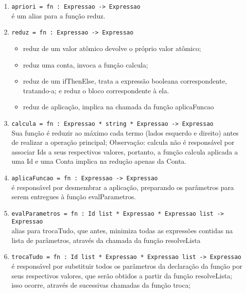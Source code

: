 \documentclass[brazil,times]{abnt}
\begin{document}
\begin{enumerate}
    \item \texttt{apriori = fn : Expressao -> Expressao} \\ é um alias para a função reduz.

    \item \texttt{reduz = fn : Expressao -> Expressao}
        \begin{itemize}
            \item reduz de um valor atômico devolve o próprio valor atômico;
            \item reduz uma conta, invoca a função calcula;
            \item reduz de um ifThenElse, trata a expressão booleana correspondente, tratando-a; e reduz o bloco correspondente à ela.
            \item reduz de aplicação, implica na chamada da função aplicaFuncao
            
        \end{itemize}

     \item \texttt{calcula = fn : Expressao * string * Expressao -> Expressao} \\
      Sua função é reduzir ao máximo cada termo (lados esquerdo e direito) antes de realizar a operação principal;
        Observação: calcula não é responsável por associar Ids a seus respectivos valores, portanto, a função calcula aplicada a uma Id e uma Conta implica na redução apenas da Conta.
        
     \item \texttt{aplicaFuncao = fn : Expressao -> Expressao} \\ é responsável por desmembrar a aplicação, preparando os parâmetros para serem entregues à função evalParametros.
     
     \item \texttt{evalParametros = fn : Id list * Expressao * Expressao list -> Expressao} \\ alias para trocaTudo, que antes, minimiza todas as expressões contidas na lista de parâmetros, através da chamada da função resolveLista
     
     \item \texttt{trocaTudo = fn : Id list * Expressao * Expressao list -> Expressao} \\ é responsável por substituir todos os parâmetros da declaração da função por seus respectivos valores, que serão obtidos a partir da função resolveLista; isso ocorre, através de sucessivas chamadas da função troca;
     

\end{enumerate}
\end{document}
